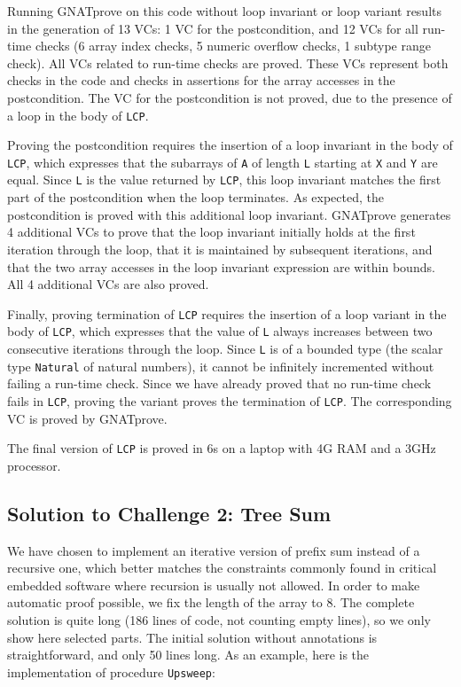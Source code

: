 \documentclass[sttt,final]{svjour}
\newcommand{\gnatprove}{GNATprove\xspace}
\begin{document}
Running \gnatprove on this code without loop invariant or loop variant results
in the generation of 13 VCs: 1 VC for the postcondition, and 12 VCs for all
run-time checks (6 array index checks, 5 numeric overflow checks, 1 subtype
range check). All VCs related to run-time checks are proved. These VCs
represent both checks in the code and checks in assertions for the array
accesses in the postcondition. The VC for the postcondition is not proved, due
to the presence of a loop in the body of \verb|LCP|.

Proving the postcondition requires the insertion of a loop invariant in the
body of \verb|LCP|, which expresses that the subarrays of \verb|A| of length
\verb|L| starting at \verb|X| and \verb|Y| are equal. Since \verb|L| is the
value returned by \verb|LCP|, this loop invariant matches the first part of the
postcondition when the loop terminates. As expected, the postcondition is
proved with this additional loop invariant. \gnatprove generates 4 additional
VCs to prove that the loop invariant initially holds at the first iteration
through the loop, that it is maintained by subsequent iterations, and that the
two array accesses in the loop invariant expression are within bounds. All 4
additional VCs are also proved.

Finally, proving termination of \verb|LCP| requires the insertion of a loop
variant in the body of \verb|LCP|, which expresses that the value of \verb|L|
always increases between two consecutive iterations through the loop. Since
\verb|L| is of a bounded type (the scalar type \verb|Natural| of natural
numbers), it cannot be infinitely incremented without failing a run-time
check. Since we have already proved that no run-time check fails in \verb|LCP|,
proving the variant proves the termination of \verb|LCP|. The corresponding VC
is proved by \gnatprove.

The final version of \verb|LCP| is proved in 6s on a laptop with 4G
RAM and a 3GHz processor.

\subsection{Solution to Challenge 2: Tree Sum}

We have chosen to implement an iterative version of prefix sum
instead of a recursive one, which better matches the constraints
commonly found in critical embedded software where recursion is
usually not allowed. In order to make automatic proof possible, we fix
the length of the array to 8. The complete solution is quite long (186
lines of code, not counting empty lines), so we only show here
selected parts. The initial solution without annotations is
straightforward, and only 50 lines long. As an example, here is the
implementation of procedure \verb|Upsweep|:
\end{document}
